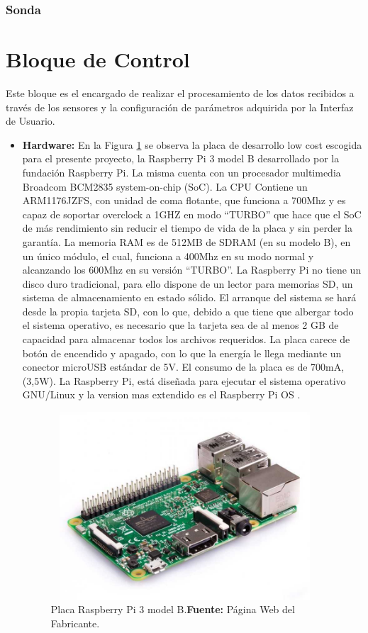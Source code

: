 \subsubsection{Sonda}
\section[Bloque de Control]{Bloque de Control}
Este bloque es el encargado de realizar el procesamiento de los datos recibidos a través de los sensores y la configuración de parámetros adquirida por la Interfaz de Usuario.

\begin{itemize}
    \item \textbf{Hardware:}
    En la Figura \ref{fig:4.4} se observa la placa de desarrollo low cost escogida para el presente proyecto, la Raspberry Pi 3 model B desarrollado por la fundación Raspberry Pi. La misma cuenta con un procesador multimedia Broadcom BCM2835 system-on-chip (SoC).
    \newline
    \hfill
    La CPU Contiene un ARM1176JZFS, con unidad de coma flotante, que funciona a 700Mhz y es capaz de soportar overclock a 1GHZ en modo “TURBO” que hace que el SoC de más rendimiento sin reducir el tiempo de vida de la placa y sin perder la garantía. 
    La memoria RAM es de 512MB de SDRAM (en su modelo B), en un único módulo, el cual, funciona a 400Mhz en su modo normal y alcanzando los 600Mhz en su versión “TURBO”.
    La  Raspberry Pi no tiene un disco duro tradicional, para ello dispone de un lector para memorias SD, un sistema de almacenamiento en estado sólido. El arranque del sistema se hará desde la propia tarjeta SD, con lo que, debido a que tiene que albergar todo el sistema operativo, es necesario que la tarjeta sea de al menos 2 GB de capacidad para almacenar todos los archivos requeridos.
    La placa carece de botón de encendido y apagado, con lo que la energía le llega mediante un conector microUSB estándar de 5V. El consumo de la placa es de 700mA, (3,5W).
    La Raspberry Pi, está diseñada para ejecutar el sistema operativo GNU/Linux y la version mas extendido es el Raspberry Pi OS .
    \begin{figure}[t]
        \centering
        \includegraphics[width=100mm, height=70mm]{Imagenes/2021/imag35.jpg}
        \caption[Placa Raspberry Pi 3 model B]{Placa Raspberry Pi 3 model B.\textbf{Fuente:} Página Web del Fabricante.}
        \label{fig:4.4}
    \end{figure}



\end{itemize}
